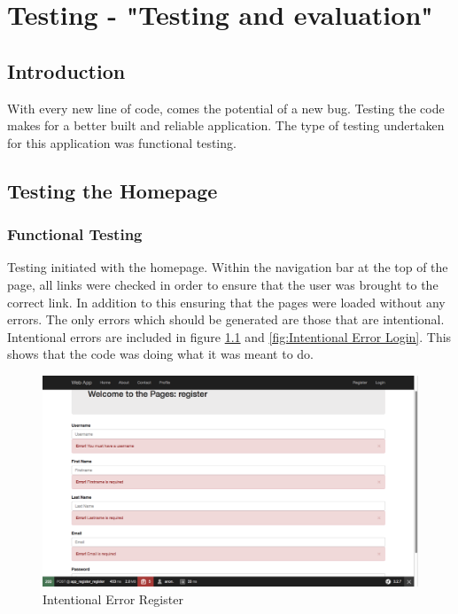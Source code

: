\chapter{Testing - "Testing and evaluation"}


\section{Introduction}

With every new line of code, comes the potential of a new bug. Testing the code makes for a better built and reliable application. The type of testing undertaken for this application was functional testing. 

\section{Testing the Homepage}

\subsection{Functional Testing}

Testing initiated with the homepage. Within the navigation bar at the top of the page, all links were checked in order to ensure that the user was brought to the correct link. In addition to this ensuring that the pages were loaded without any errors. The only errors which should be generated are those that are intentional. Intentional errors are included in figure \ref{fig:Intentional Error Register} and \ref{fig:Intentional Error Login}. This shows that the code was doing what it was meant to do.

\begin{figure}[htbp]
   \centering
   \includegraphics[width=400pt]{figures/intentional_error_register.png} %
   \caption{Intentional Error Register}
   \label{fig:Intentional Error Register}
\end{figure}

